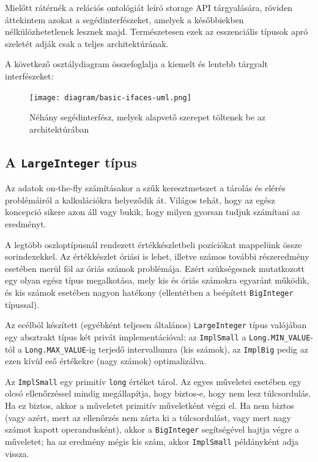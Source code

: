 \documentclass[
    parspace,
    noindent,
    nohyp,
]{elteiktdk}[2023/04/10]
\begin{document}
Mielőtt rátérnék a relációs ontológiát leíró storage API tárgyalására,
röviden áttekintem azokat a segédinterfészeket,
amelyek a későbbiekben nélkülözhetetlenek lesznek majd.
Természetesen ezek az esszenciális típusok apró szeletét adják csak a teljes architektúrának.

A következő osztálydiagram összefoglalja a kiemelt és lentebb tárgyalt interfészeket:

\begin{figure}[H]
\centering
\texttt{[image: diagram/basic-ifaces-uml.png]}
\caption[Alapvető segédinterfészek]{
    Néhány segédinterfész, melyek alapvető szerepet töltenek be az architektúrában
}
\end{figure}

\subsection{A \texttt{LargeInteger} típus}

Az adatok on-the-fly számításakor a szűk keresztmetszet
a tárolás és elérés problémáiról a kalkulációkra helyeződik át.
Világos tehát, hogy az egész koncepció sikere azon áll vagy bukik,
hogy milyen gyorsan tudjuk számítani az eredményt.

A legtöbb oszloptípusnál rendezett értékkészletbeli pozíciókat mappelünk össze sorindexekkel.
Az értékkészlet óriási is lehet,
illetve számos további részeredmény esetében merül föl az óriás számok problémája.
Ezért szükségesnek mutatkozott egy olyan egész típus megalkotása,
mely kis és óriás számokra egyaránt működik,
és kis számok esetében nagyon hatékony (ellentétben a beépített \texttt{BigInteger} típussal).

Az ecélból készített (egyébként teljesen általános) \texttt{LargeInteger} típus
valójában egy absztrakt típus két privát implementációval:
az \texttt{ImplSmall} a \texttt{Long.MIN\_VALUE}-tól a \texttt{Long.MAX\_VALUE}-ig
terjedő intervallumra (kis számok),
az \texttt{ImplBig} pedig az ezen kívül eső értékekre (nagy számok) optimalizálva.

Az \texttt{ImplSmall} egy primitív \texttt{long} értéket tárol.
Az egyes műveletei esetében egy olcsó ellenőrzéssel mindig megállapítja,
hogy biztos-e, hogy nem lesz túlcsordulás.
Ha ez biztos, akkor a műveletet primitív műveletként végzi el.
Ha nem biztos
(vagy azért, mert az ellenőrzés nem zárta ki a túlcsordulást,
vagy mert nagy számot kapott operandusként),
akkor a \texttt{BigInteger} segítségével hajtja végre a műveletet;
ha az eredmény mégis kis szám, akkor \texttt{ImplSmall} példányként adja vissza.
\end{document}
